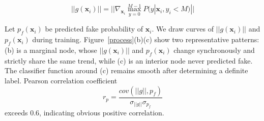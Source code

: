 	\[||g(\mathbf{x}_i)|| = ||\nabla_{\mathbf{x}_i} \max\limits_{y=0}^{M-1} P(y |\mathbf{x}_i, y_i < M)||\]

Let $p_f(\mathbf{x}_i)$ be predicted fake probability of $\mathbf{x}_i$. We draw curves of $||g(\mathbf{x}_i)||$ and $p_f(\mathbf{x}_i)$ during training. Figure~\ref{process}(b)(c) show two representative patterns: (b) is a marginal node, whose $||g(\mathbf{x}_i)||$ and $p_f(\mathbf{x}_i)$ change synchronously and strictly share the same trend, while (c) is an interior node never predicted fake. The classifier function around (c) remains smooth after determining a definite label. Pearson correlation coefficient $$r_p = \frac{cov(||g||, p_f)}{\sigma_{||g||}\sigma_{p_f}}$$ exceeds 0.6, indicating obvious positive correlation. 


